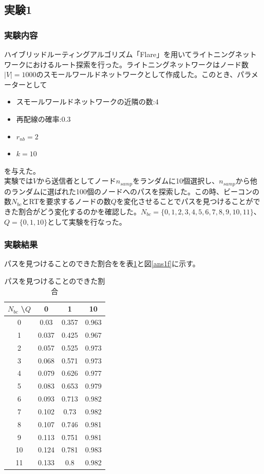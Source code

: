 \documentclass[12pt]{jarticle}
\begin{document}
\subsection{実験1}
\subsubsection{実験内容}
ハイブリッドルーティングアルゴリズム「Flare」を用いてライトニングネットワークにおけるルート探索を行った。ライトニングネットワークはノード数$|V|=1000$のスモールワールドネットワーク\cite{swn}として作成した。このとき、パラメーターとして
\begin{itemize}
\item スモールワールドネットワークの近隣の数:4
\item 再配線の確率:0.3
\item $r_{nb} = 2$
\item $k=10$
\end{itemize}
を与えた。\\
実験では$V$から送信者としてノード$n_{samp}$をランダムに10個選択し、$n_{samp}$から他のランダムに選ばれた100個のノードへのパスを探索した。この時、ビーコンの数$N_{bc}$とRTを要求するノードの数$Q$を変化させることでパスを見つけることができた割合がどう変化するのかを確認した。$N_{bc}=\{0,1,2,3,4,5,6,7,8,9,10,11\}$、$Q=\{0,1,10\}$として実験を行なった。

\subsubsection{実験結果}
パスを見つけることのできた割合をを表\ref{ans1t}と図\ref{ans1f}に示す。

\begin{table}[h]
	\begin{center}
    \caption{パスを見つけることのできた割合}
		\begin{tabular}{|c|ccc|}
			\hline
            $N_{bc}$ \textbackslash $Q$ & 0 & 1 & 10\\
            \hline
			0  & 0.03  & 0.357 & 0.963\\
			1  & 0.037 & 0.425 & 0.967\\
			2  & 0.057 & 0.525 & 0.973\\
			3  & 0.068 & 0.571 & 0.973\\
			4  & 0.079 & 0.626 & 0.977\\
			5  & 0.083 & 0.653 & 0.979\\
			6  & 0.093 & 0.713 & 0.982\\
			7  & 0.102 & 0.73  & 0.982\\
			8  & 0.107 & 0.746 & 0.981\\
			9  & 0.113 & 0.751 & 0.981\\
			10 & 0.124 & 0.781 & 0.983\\
			11 & 0.133 & 0.8   & 0.982\\
            \hline
		\end{tabular}
        \label{ans1t}
	\end{center}
\end{table}
\end{document}
